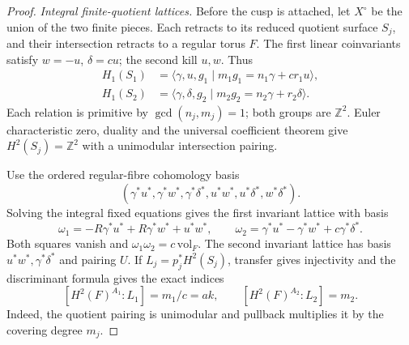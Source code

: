 \begin{proof}
\emph{Integral finite-quotient lattices.}
Before the cusp is attached, let $X^\circ$ be the union of the two
finite pieces. Each retracts to its reduced quotient surface $S_j$,
and their intersection retracts to a regular torus $F$.
The first linear coinvariants satisfy $w=-u$, $\delta=cu$;
the second kill $u,w$. Thus
\[
 \begin{split}
 H_1(S_1)&=\langle\gamma,u,g_1\mid
             m_1g_1=n_1\gamma+cr_1u\rangle,\\
 H_1(S_2)&=\langle\gamma,\delta,g_2\mid
             m_2g_2=n_2\gamma+r_2\delta\rangle.
 \end{split}
\]
Each relation is primitive by $\gcd(n_j,m_j)=1$; both groups are
$\mathbb Z^2$. Euler characteristic zero, duality and the universal
coefficient theorem give $H^2(S_j)=\mathbb Z^2$ with a unimodular
intersection pairing.

Use the ordered regular-fibre cohomology basis
\[
 (\gamma^*u^*,\gamma^*w^*,\gamma^*\delta^*,
            u^*w^*,u^*\delta^*,w^*\delta^*).
\]
Solving the integral fixed equations gives the first invariant
lattice with basis
\[
 \omega_1=-R\gamma^*u^*+R\gamma^*w^*+u^*w^*,\qquad
 \omega_2=\gamma^*u^*-\gamma^*w^*+c\gamma^*\delta^*.
\]
Both squares vanish and $\omega_1\omega_2=c\,\mathrm{vol}_F$.
The second invariant lattice has basis
$u^*w^*,\gamma^*\delta^*$ and pairing $U$.
If $L_j=p_j^*H^2(S_j)$, transfer gives injectivity and the
discriminant formula gives the exact indices
\[
 [H^2(F)^{A_1}:L_1]=m_1/c=ak,
 \qquad [H^2(F)^{A_2}:L_2]=m_2.
\]
Indeed, the quotient pairing is unimodular and pullback multiplies
it by the covering degree $m_j$.


\end{proof}
